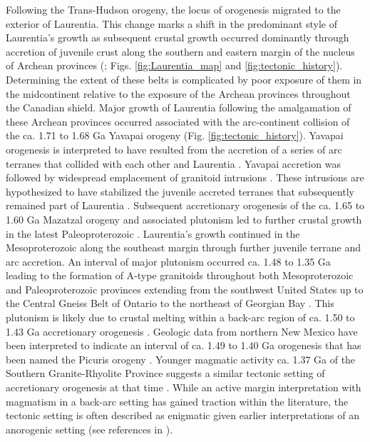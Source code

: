 \documentclass[11pt,letterpaper]{article}
\begin{document}
Following the Trans-Hudson orogeny, the locus of orogenesis migrated to the exterior of Laurentia. This change marks a shift in the predominant style of Laurentia's growth as subsequent crustal growth occurred dominantly through accretion of juvenile crust along the southern and eastern margin of the nucleus of Archean provinces (\citealp{Whitmeyer2007a}; Figs. \ref{fig:Laurentia_map} and \ref{fig:tectonic_history}). Determining the extent of these belts is complicated by poor exposure of them in the midcontinent relative to the exposure of the Archean provinces throughout the Canadian shield. Major growth of Laurentia following the amalgamation of these Archean provinces occurred associated with the arc-continent collision of the ca. 1.71 to 1.68 Ga Yavapai orogeny (Fig. \ref{fig:tectonic_history}). Yavapai orogenesis is interpreted to have resulted from the accretion of a series of arc terranes that collided with each other and Laurentia \citep{Karlstrom2001a}. Yavapai accretion was followed by widespread emplacement of granitoid intrusions \citep{Whitmeyer2007a}. These intrusions are hypothesized to have stabilized the juvenile accreted terranes that subsequently remained part of Laurentia \citep{Whitmeyer2007a}. Subsequent accretionary orogenesis of the ca. 1.65 to 1.60 Ga Mazatzal orogeny and associated plutonism led to further crustal growth in the latest Paleoproterozoic \citep{Karlstrom1988a}. Laurentia's growth continued in the Mesoproterozoic along the southeast margin through further juvenile terrane and arc accretion. An interval of major plutonism occurred ca. 1.48 to 1.35 Ga leading to the formation of A-type granitoids throughout both Mesoproterozoic and Paleoproterozoic provinces extending from the southwest United States up to the Central Gneiss Belt of Ontario to the northeast of Georgian Bay \citep{Slagstad2009a}. This plutonism is likely due to crustal melting within a back-arc region of ca. 1.50 to 1.43 Ga accretionary orogenesis \citep{Bickford2015a}. Geologic data from northern New Mexico have been interpreted to indicate an interval of ca. 1.49 to 1.40 Ga orogenesis that has been named the Picuris orogeny \citep{Daniel2013a}. Younger magmatic activity ca. 1.37 Ga of the Southern Granite-Rhyolite Province suggests a similar tectonic setting of accretionary orogenesis at that time \citep{Bickford2015a}. While an active margin interpretation with magmatism in a back-arc setting has gained traction within the literature, the tectonic setting is often described as enigmatic given earlier interpretations of an anorogenic setting (see references in \citealp{Slagstad2009a}). 
\end{document}
